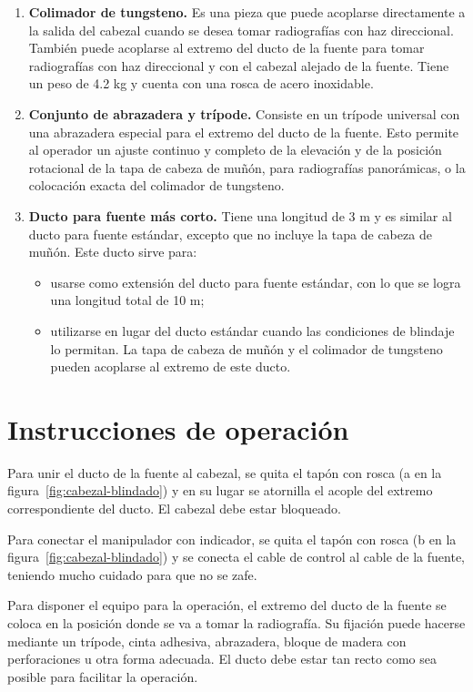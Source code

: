 \begin{enumerate}
  \item \textbf{Colimador de tungsteno.} Es una pieza que puede acoplarse directamente a la salida del cabezal cuando se desea tomar radiografías con haz direccional. También puede acoplarse al extremo del ducto de la fuente para tomar radiografías con haz direccional y con el cabezal alejado de la fuente. Tiene un peso de 4.2 kg y cuenta con una rosca de acero inoxidable.

  \item \textbf{Conjunto de abrazadera y trípode.} Consiste en un trípode universal con una abrazadera especial para el extremo del ducto de la fuente. Esto permite al operador un ajuste continuo y completo de la elevación y de la posición rotacional de la tapa de cabeza de muñón, para radiografías panorámicas, o la colocación exacta del colimador de tungsteno.

  \item \textbf{Ducto para fuente más corto.} Tiene una longitud de 3 m y es similar al ducto para fuente estándar, excepto que no incluye la tapa de cabeza de muñón. Este ducto sirve para:
  \begin{itemize}
    \item usarse como extensión del ducto para fuente estándar, con lo que se logra una longitud total de 10 m;
    \item utilizarse en lugar del ducto estándar cuando las condiciones de blindaje lo permitan. La tapa de cabeza de muñón y el colimador de tungsteno pueden acoplarse al extremo de este ducto.
  \end{itemize}
\end{enumerate}

\section{Instrucciones de operación}

Para unir el ducto de la fuente al cabezal, se quita el tapón con rosca (a en la figura~\ref{fig:cabezal-blindado}) y en su lugar se atornilla el acople del extremo correspondiente del ducto. El cabezal debe estar bloqueado.

Para conectar el manipulador con indicador, se quita el tapón con rosca (b en la figura~\ref{fig:cabezal-blindado}) y se conecta el cable de control al cable de la fuente, teniendo mucho cuidado para que no se zafe.

Para disponer el equipo para la operación, el extremo del ducto de la fuente se coloca en la posición donde se va a tomar la radiografía. Su fijación puede hacerse mediante un trípode, cinta adhesiva, abrazadera, bloque de madera con perforaciones u otra forma adecuada. El ducto debe estar tan recto como sea posible para facilitar la operación.

